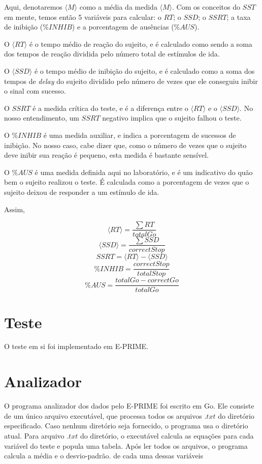 \documentclass[12pt, a4paper, twoside]{article}
\begin{document}
Aqui, denotaremos $\langle M \rangle$ como a média da medida $\langle M \rangle$. Com os conceitos do $SST$ em mente, temos então 5 variáveis para calcular: o $RT$; o $SSD$; o $SSRT$; a taxa de inibição ($\%INHIB$) e a porcentagem de ausências ($\%AUS$).

O $\langle RT \rangle$ é o tempo médio de reação do sujeito, e é calculado como sendo a soma dos tempos de reação dividida pelo número total de estímulos de ida. 

O $\langle SSD \rangle$ é o tempo médio de inibição do sujeito, e é calculado como a soma dos tempos de \textit{delay} do sujeito dividido pelo número de vezes que ele conseguiu inibir o sinal com sucesso.

O $SSRT$ é a medida crítica do teste, e é a diferença entre o $\langle RT \rangle$ e o $\langle SSD \rangle$. No nosso entendimento, um $SSRT$ negativo implica que o sujeito falhou o teste.

O $\%INHIB$ é uma medida auxiliar, e indica a porcentagem de sucessos de inibição. No nosso caso, cabe dizer que, como o número de vezes que o sujeito deve inibir sua reação é pequeno, esta medida é bastante sensível.

O $\%AUS$ é uma medida definida aqui no laboratório, e é um indicativo do quão bem o sujeito realizou o teste. É calculada como a porcentagem de vezes que o sujeito deixou de responder a um estímulo de ida.

Assim,

$$\langle RT \rangle = \frac{\sum RT}{totalGo}$$
$$\langle SSD \rangle = \frac{\sum SSD}{correctStop}$$
$$SSRT = \langle RT \rangle - \langle SSD \rangle$$
$$\%INHIB = \frac{correctStop}{totalStop} $$
$$\%AUS = \frac{totalGo-correctGo}{totalGo} $$

\section{Teste}

O teste em si foi implementado em E-PRIME.

\section{Analizador}

O programa analizador dos dados pelo E-PRIME foi escrito em Go. Ele consiste de um único arquivo executável, que processa todos os arquivos $.txt$ do diretório especificado. Caso nenhum diretório seja fornecido, o programa usa o diretório atual. Para arquivo $.txt$ do diretório, o executável calcula as equações para cada variável do teste e popula uma tabela. Após ler todos os arquivos, o programa calcula a média e o desvio-padrão. de cada uma dessas variáveis
\end{document}
